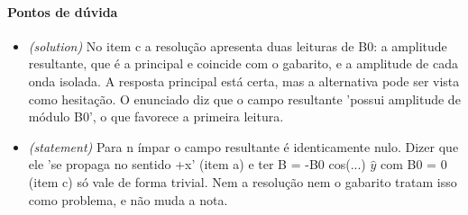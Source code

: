 \documentclass{article}%
\begin{document}
\paragraph{Pontos de dúvida}%
\begin{itemize}%
\item%
\textit{(solution)} No item c a resolução apresenta duas leituras de B0: a amplitude resultante, que é a principal e coincide com o gabarito, e a amplitude de cada onda isolada. A resposta principal está certa, mas a alternativa pode ser vista como hesitação. O enunciado diz que o campo resultante 'possui amplitude de módulo B0', o que favorece a primeira leitura.%
\item%
\textit{(statement)} Para n ímpar o campo resultante é identicamente nulo. Dizer que ele 'se propaga no sentido +x' (item a) e ter B = -B0 cos(...) $\hat y$ com B0 = 0 (item c) só vale de forma trivial. Nem a resolução nem o gabarito tratam isso como problema, e não muda a nota.%
\end{itemize}%
\end{document}
